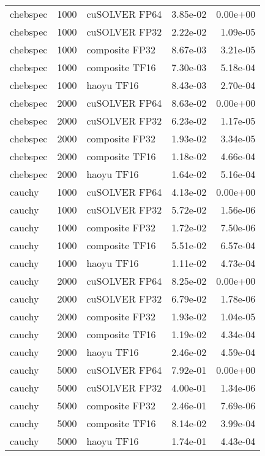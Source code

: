 \begin{table}
\begin{tabular}{lrlrr}
 chebspec &  1000 &  cuSOLVER FP64 &  3.85e-02 &        0.00e+00 \\
 chebspec &  1000 &  cuSOLVER FP32 &  2.22e-02 &        1.09e-05 \\
 chebspec &  1000 & composite FP32 &  8.67e-03 &        3.21e-05 \\
 chebspec &  1000 & composite TF16 &  7.30e-03 &        5.18e-04 \\
 chebspec &  1000 &     haoyu TF16 &  8.43e-03 &        2.70e-04 \\
 chebspec &  2000 &  cuSOLVER FP64 &  8.63e-02 &        0.00e+00 \\
 chebspec &  2000 &  cuSOLVER FP32 &  6.23e-02 &        1.17e-05 \\
 chebspec &  2000 & composite FP32 &  1.93e-02 &        3.34e-05 \\
 chebspec &  2000 & composite TF16 &  1.18e-02 &        4.66e-04 \\
 chebspec &  2000 &     haoyu TF16 &  1.64e-02 &        5.16e-04 \\
   cauchy &  1000 &  cuSOLVER FP64 &  4.13e-02 &        0.00e+00 \\
   cauchy &  1000 &  cuSOLVER FP32 &  5.72e-02 &        1.56e-06 \\
   cauchy &  1000 & composite FP32 &  1.72e-02 &        7.50e-06 \\
   cauchy &  1000 & composite TF16 &  5.51e-02 &        6.57e-04 \\
   cauchy &  1000 &     haoyu TF16 &  1.11e-02 &        4.73e-04 \\
   cauchy &  2000 &  cuSOLVER FP64 &  8.25e-02 &        0.00e+00 \\
   cauchy &  2000 &  cuSOLVER FP32 &  6.79e-02 &        1.78e-06 \\
   cauchy &  2000 & composite FP32 &  1.93e-02 &        1.04e-05 \\
   cauchy &  2000 & composite TF16 &  1.19e-02 &        4.34e-04 \\
   cauchy &  2000 &     haoyu TF16 &  2.46e-02 &        4.59e-04 \\
   cauchy &  5000 &  cuSOLVER FP64 &  7.92e-01 &        0.00e+00 \\
   cauchy &  5000 &  cuSOLVER FP32 &  4.00e-01 &        1.34e-06 \\
   cauchy &  5000 & composite FP32 &  2.46e-01 &        7.69e-06 \\
   cauchy &  5000 & composite TF16 &  8.14e-02 &        3.99e-04 \\
   cauchy &  5000 &     haoyu TF16 &  1.74e-01 &        4.43e-04 \\

\end{tabular}
\end{table}
